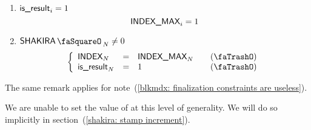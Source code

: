 \begin{enumerate}
\begin{enumerate}
                \end{enumerate}
	\item \If $\textsf{is\_result}_{i} = 1$ \Then
		\[
			\textsf{INDEX\_MAX}_{i} = 1
		\]
        \item \If $\shakiraStamp_{N} \neq 0$ \Then
                \[
                        \left\{ \begin{array}{lclr}
                                \index           _{N} & = & \indexMax_{N} & \quad (\trash) \\
                                \locIsResult     _{N} & = & 1             & \quad (\trash) \\
                        \end{array} \right.
                \]
\end{enumerate}
\saNote{} The same remark applies for note~(\ref{blkmdx: finalization constraints are useless}).

\saNote{} We are unable to set the value of \indexMax{} at this level of generality. We will do so implicitly in section~(\ref{shakira: stamp increment}).
